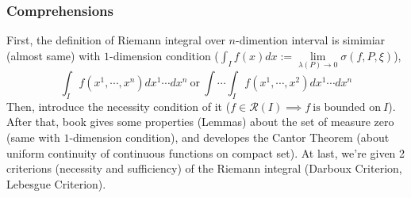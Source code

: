 \documentclass{Math_Note}
\begin{document}
\subsubsection{Comprehensions}
First, the definition of Riemann integral over $n$-dimention interval is simimiar (almost same) with $1$-dimension condition ($\int_{I}f(x)dx := \lim\limits_{\lambda(P)\to 0}\sigma(f,P,\xi)$),
$$\int_{I}f(x^1,\cdots,x^n)dx^1\cdots dx^n\ \text{or}\ \int\cdots\int_{I}f(x^1,\cdots,x^2)dx^1\cdots dx^n$$
Then, introduce the necessity condition of it ($f\in\mathcal{R}(I)\implies f\ \text{is bounded on}\ I$).
After that, book gives some properties (Lemmas) about the set of measure zero (same with $1$-dimension condition), and developes the Cantor Theorem (about uniform continuity of continuous functions on compact set).
At last, we're given 2 criterions (necessity and sufficiency) of the Riemann integral (Darboux Criterion, Lebesgue Criterion). 
\newline\newline
{}
\newline
{}
\newline
{}
\newline
{}
\newpage
\end{document}
